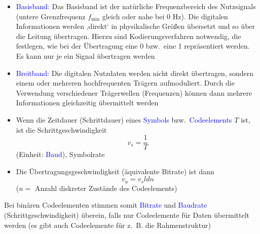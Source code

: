 \begin{itemize}
    \item \textcolor{blue}{Basisband:} Das Basisband ist der natürliche Frequenzbereich des Nutzsignals (untere Grenzfrequenz $f_{\min}$ gleich oder nahe bei 0 Hz).
    Die digitalen Informationen werden ‚direkt‘ in physikalische Größen übersetzt und so über die Leitung übertragen.
    Hierzu sind Kodierungsverfahren notwendig, die festlegen, wie bei der Übertragung eine 0 bzw.\ eine 1 repräsentiert werden.
    Es kann nur je ein Signal übertragen werden
    \item \textcolor{blue}{Breitband:} Die digitalen Nutzdaten werden nicht direkt übertragen, sondern einem oder mehreren hochfrequenten Trägern aufmoduliert.
    Durch die Verwendung verschiedener Trägerwellen (Frequenzen) können dann mehrere Informationen gleichzeitig übermittelt werden
\end{itemize}

\begin{itemize}
    \item Wenn die Zeitdauer (Schrittdauer) eines \textcolor{blue}{Symbols} bzw.\ \textcolor{blue}{Codeelements} $T$ ist,
    ist die Schrittgeschwindigkeit \[v_s = \frac{1}{T}\] (Einheit: \textcolor{blue}{Baud}), Symbolrate
    \item Die Übertragungsgeschwindigkeit (äquivalente Bitrate) ist dann \[v_u = v_s ld n\] ($n=$ Anzahl diskreter Zustände des Codeelements)
\end{itemize}
Bei binären Codeelementen stimmen somit \textcolor{blue}{Bitrate} und \textcolor{blue}{Baudrate} (Schrittgeschwindigkeit) überein, falls nur Codeelemente für Daten übermittelt werden (es gibt auch Codeelemente für z.\ B. die Rahmenstruktur)


